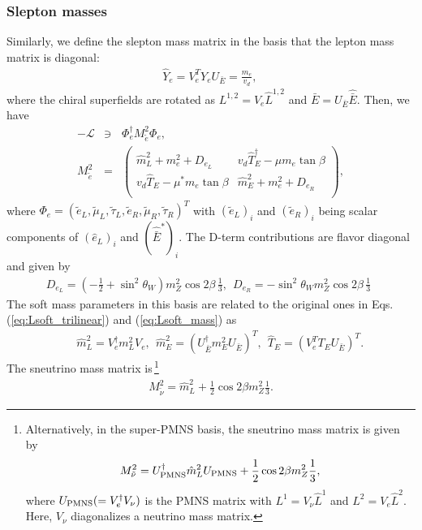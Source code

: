 \documentclass[preprint,3p,12pt]{elsarticle}
\begin{document}
{\subsubsection{Slepton masses}
Similarly, we define the slepton mass matrix in the basis that the lepton mass matrix is diagonal:
\begin{eqnarray}
\hat Y_e = V_e^T Y_e U_{\bar E} = \frac{m_e}{v_d} , \, 
\end{eqnarray}
where the chiral superfields are rotated as $L^{1,2} = V_e \hat L^{1,2}$ and $\bar E = U_{\bar E} \hat{\bar E}$.
Then, we have
\begin{eqnarray}
-\mathcal{L} &\ni& \Phi_e^\dag  M_{\tilde e}^2 \Phi_e, \nonumber \\
M_{\tilde e}^2 &=& 
\left(
\begin{array}{cc}
\hat m_L^2  + m_e^2 + D_{e_L}&    v_d \hat T_E^\dag - \mu m_e \tan\beta  \\
v_d \hat T_E  - \mu^* m_e \tan\beta&    \hat m_{E}^2 + m_e^2 + D_{e_R}\\
\end{array}
\right),
\end{eqnarray}
where $\Phi_e = \left( \tilde e_L, \tilde \mu_L,  \tilde \tau_L,  \tilde e_R, \tilde \mu_R,  \tilde \tau_R
\right)^T$ with $(\tilde e_L)_i$ and $(\tilde e_R)_i$ being scalar components of $(\hat e_L)_i$ and $(\hat{\bar E}^*)_i$. The D-term contributions are flavor diagonal and given by
\begin{eqnarray}
D_{e_L} = (-\frac{1}{2}  + \sin^2\theta_W) m_Z^2 \cos2 \beta \, \frac{1}{3}, \ \
D_{e_R}= - \sin^2\theta_W m_Z^2 \cos2 \beta \, \frac{1}{3}\ \ 
\end{eqnarray}
The soft mass parameters in this basis are related to the original ones in Eqs. (\ref{eq:Lsoft_trilinear}) and (\ref{eq:Lsoft_mass}) as
 \begin{eqnarray}
&& \hat m_{L}^2 = V_{e}^\dag m_{L}^2 V_e, \ \ \hat m_E^2  = (U_{\bar E}^\dag m_{E}^2 U_{\bar E})^T, \ \ 
 \hat T_E = (V_e^T T_E U_{\bar E})^T.
\end{eqnarray}
The sneutrino mass matrix is\,\footnote{
%
Alternatively, in the super-PMNS basis, the sneutrino mass matrix is given by
\begin{eqnarray}
M_{\tilde \nu}^2 = U_{\rm PMNS}^\dag \hat m_{L}^2 U_{\rm PMNS} +  \frac{1}{2}\cos2\beta m_Z^2 \frac{1}{3},
\end{eqnarray}
where $U_{\rm PMNS} ( = V_e^\dag V_{\nu} )$ is the PMNS matrix with $L^{1} = V_{\nu} \hat L^{1}$ and $L^{2} = V_{e} \hat L^{2}$.
Here, $V_{\nu}$ diagonalizes a neutrino mass matrix.
%
}
\begin{eqnarray}
M_{\tilde \nu}^2 = \hat m_{L}^2  +  \frac{1}{2}\cos2\beta m_Z^2 \frac{1}{3}.
\end{eqnarray}




}
\end{document}

